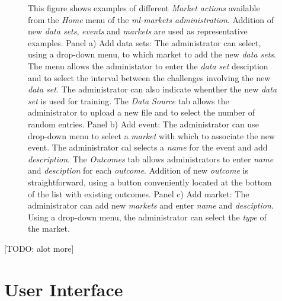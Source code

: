 \documentclass[bsc,frontabs,twoside,singlespacing,parskip,deptreport]{infthesis}     %
\begin{document}
\begin{figure}
{This figure shows examples of different {\it Market actions} available from the {\it Home} menu of the {\it ml-markets administration}. Addition of new {\it data sets}, {\it events} and {\it markets} are used as representative examples. Panel a) Add data sets: The administrator can select, using a drop-down menu, to which market to add the new {\it data sets}. The menu allows the administator to enter the {\it data set} desciption and to select the interval between the challenges involving the new {\it data set}. The administrator can also indicate whenther the new {\it data set} is used for training. The {\it Data Source} tab allows the administrator to upload a new file and to select the number of random entries. Panel b) Add event: The administrator can use drop-down menu to select a {\it market} with which to associate the new event. The administrator cal selects a {\it name} for the event and add {\it description}. The {\it Outcomes} tab allows administrators to enter {\it name} and {\it desciption} for each {\it outcome}. Addition of new {\it outcome} is straightforward, using a button conveniently located at the bottom of the list with existing outcomes. Panel c) Add market: The administrator can add new {\it markets} and enter {\it name} and {\it desciption}. Using a drop-down menu, the administrator can select the {\it type} of the market.}  
\end{figure}



[TODO: alot more]
\section{User Interface}
\end{document}
